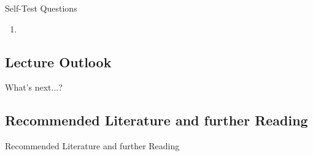 \begin{frame}{Self-Test Questions}{}\important
	\begin{enumerate}
		\item 
	\end{enumerate}
\end{frame}


\subsection{Lecture Outlook}

\begin{frame}{What's next...?}{}
\end{frame}


\subsection{Recommended Literature and further Reading}

\begin{frame}{Recommended Literature and further Reading}{}
	\footnotesize
	\begin{thebibliography}{2}

	\end{thebibliography}
\end{frame}


\makethanks


